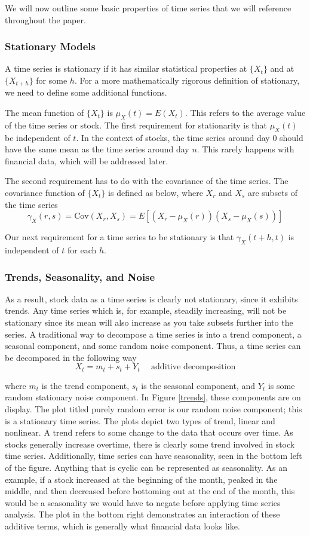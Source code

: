 \documentclass[12pt]{article}
\begin{document}
We will now outline some basic properties of time series that we will reference throughout the paper.

\subsubsection{Stationary Models}  
A time series is stationary if it has similar statistical properties at $\{X_t\}$ and at $\{X_{t+h}\}$ for some $h$. For a more mathematically rigorous definition of stationary, we need to define some additional functions.

The mean function of $\{X_t\}$ is $\mu_X(t) = E(X_t)$. This refers to the average value of the time series or stock. The first requirement for stationarity is that $\mu_X(t)$ be independent of $t$. In the context of stocks, the time series around day 0 should have the same mean as the time series around day $n$. This rarely happens with financial data, which will be addressed later.

The second requirement has to do with the covariance of the time series. The covariance function of $\{X_t\}$ is defined as below, where $X_r$ and $X_s$ are subsets of the time series
$$\gamma _X(r,s) = \text{Cov}(X_r, X_s) = E[(X_r - \mu _X(r))(X_s - \mu_X(s))]$$

Our next requirement for a time series to be stationary is that $\gamma_X(t+h, t)$ is independent of $t$ for each $h$. 

\subsubsection{Trends, Seasonality, and Noise}
As a result, stock data as a time series is clearly not stationary, since it exhibits trends. Any time series which is, for example, steadily increasing, will not be stationary since its mean will also increase as you take subsets further into the series. A traditional way to decompose a time series is into a trend component, a seasonal component, and some random noise component. Thus, a time series can be decomposed in the following way
$$X_t = m_t + s_t + Y_t \ \ \ \ \ \ \text{additive decomposition}$$

where $m_t$ is the trend component, $s_t$ is the seasonal component, and $Y_t$ is some random stationary noise component. In Figure \ref{trends}, these components are on display. The plot titled purely random error is our random noise component; this is a stationary time series. The plots depict two types of trend, linear and nonlinear. A trend refers to some change to the data that occurs over time. As stocks generally increase overtime, there is clearly some trend involved in stock time series. Additionally, time series can have seasonality, seen in the bottom left of the figure. Anything that is cyclic can be represented as seasonality. As an example, if a stock increased at the beginning of the month, peaked in the middle, and then decreased before bottoming out at the end of the month, this would be a seasonality we would have to negate before applying time series analysis. The plot in the bottom right demonstrates an interaction of these additive terms, which is generally what financial data looks like. \cite[22]{timeseries}
\end{document}
